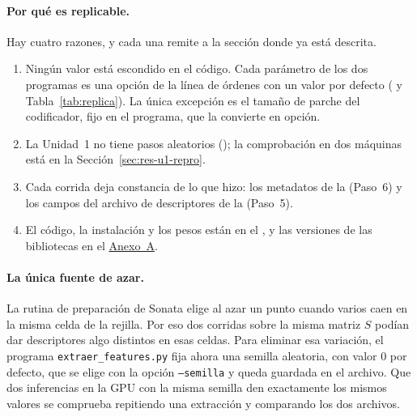 \paragraph*{Por qué es replicable.}
Hay cuatro razones, y cada una remite a la sección donde ya está descrita.
\begin{enumerate}
\item Ningún valor está escondido en el código. Cada parámetro de los dos
programas es una opción de la línea de órdenes con un valor por defecto
( y Tabla~\ref{tab:replica}). La única
excepción es el tamaño de parche del codificador, fijo en el programa, que la
 convierte en opción.
\item La Unidad~1 no tiene pasos aleatorios
(); la
comprobación en dos máquinas está en la Sección~\ref{sec:res-u1-repro}.
\item Cada corrida deja constancia de lo que hizo: los metadatos de la
 (Paso~6) y los campos del archivo de
descriptores de la  (Paso~5).
\item El código, la instalación y los pesos están en el
, y las versiones de las bibliotecas en
el \hyperref[sec:anexo-software]{Anexo~A}.
\end{enumerate}

\paragraph*{La única fuente de azar.}
La rutina de preparación de Sonata elige al azar un punto cuando varios caen en
la misma celda de la rejilla. Por eso dos corridas sobre la misma matriz $S$
podían dar descriptores algo distintos en esas celdas. Para eliminar esa
variación, el programa \texttt{extraer\_features.py} fija ahora una semilla
aleatoria, con valor 0 por defecto, que se elige con la opción
\texttt{--semilla} y queda guardada en el archivo. Que dos inferencias en la GPU
con la misma semilla den exactamente los mismos valores se comprueba repitiendo
una extracción y comparando los dos archivos.

